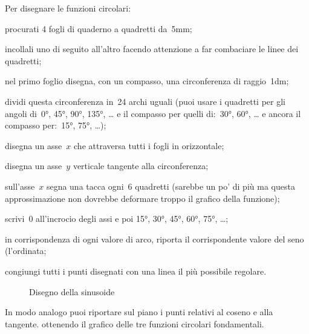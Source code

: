 \begin{procedura}
 Per disegnare le funzioni circolari:
 \begin{enumeratea}
  \item procurati 4 fogli di quaderno a quadretti da~5mm;
  \item incollali uno di seguito all'altro 
   facendo attenzione a far combaciare le linee dei quadretti;
  \item nel primo foglio disegna, con un compasso, una circonferenza di
   raggio~1dm;
  \item dividi questa circonferenza in~24 archi uguali 
   (puoi usare i quadretti per gli angoli di~0°, 45°, 90°, 135°, \dots 
   e il compasso per quelli di:~30°, 60°, \dots
   e ancora il compasso per:~15°, 75°, \dots);
  \item disegna un asse~$x$ che attraversa tutti i fogli in orizzontale;
  \item disegna un asse~$y$ verticale tangente alla circonferenza;
  \item sull'asse~$x$ segna una tacca ogni~6 quadretti 
   (sarebbe un po' di più ma questa approssimazione non dovrebbe deformare 
   troppo il grafico della funzione);
  \item scrivi~0 all'incrocio degli assi e poi 15°, 30°, 45°, 60°, 75°, \dots;
  \item in corrispondenza di ogni valore di arco, riporta il corrispondente
   valore del seno (l'ordinata;
  \item congiungi tutti i punti disegnati con una linea il più possibile 
   regolare.
 \end{enumeratea}
\end{procedura}

\begin{figure}[h] 
 \vspace{-6pt}
  \begin{center}
\begin{inaccessibleblock}
    
    \caption{Disegno della sinusoide}
    \label{fig:trigo_sinusoide}
\end{inaccessibleblock}
  \end{center}
   \vspace{-24pt}
\end{figure} 

In modo analogo puoi riportare sul piano i punti relativi al coseno e alla 
tangente. ottenendo il grafico delle tre funzioni circolari fondamentali.

